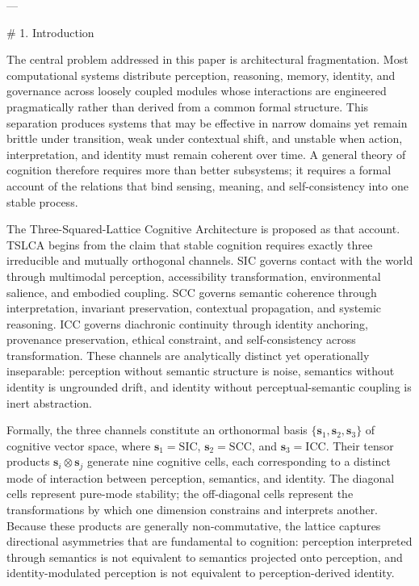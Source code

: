 ---

# 1. Introduction

The central problem addressed in this paper is architectural fragmentation. Most
computational systems distribute perception, reasoning, memory, identity, and
governance across loosely coupled modules whose interactions are engineered
pragmatically rather than derived from a common formal structure. This separation
produces systems that may be effective in narrow domains yet remain brittle under
transition, weak under contextual shift, and unstable when action, interpretation,
and identity must remain coherent over time. A general theory of cognition
therefore requires more than better subsystems; it requires a formal account of the
relations that bind sensing, meaning, and self-consistency into one stable process.

The Three-Squared-Lattice Cognitive Architecture is proposed as that account.
TSLCA begins from the claim that stable cognition requires exactly three irreducible
and mutually orthogonal channels. SIC governs contact with the world through
multimodal perception, accessibility transformation, environmental salience, and
embodied coupling. SCC governs semantic coherence through interpretation, invariant
preservation, contextual propagation, and systemic reasoning. ICC governs diachronic
continuity through identity anchoring, provenance preservation, ethical constraint,
and self-consistency across transformation. These channels are analytically distinct
yet operationally inseparable: perception without semantic structure is noise,
semantics without identity is ungrounded drift, and identity without
perceptual-semantic coupling is inert abstraction.

Formally, the three channels constitute an orthonormal basis
\(\{\mathbf{s}_1, \mathbf{s}_2, \mathbf{s}_3\}\) of cognitive vector space, where
\(\mathbf{s}_1 = \mathrm{SIC}\), \(\mathbf{s}_2 = \mathrm{SCC}\), and
\(\mathbf{s}_3 = \mathrm{ICC}\). Their tensor products \(\mathbf{s}_i \otimes
\mathbf{s}_j\) generate nine cognitive cells, each corresponding to a distinct mode
of interaction between perception, semantics, and identity. The diagonal cells
represent pure-mode stability; the off-diagonal cells represent the transformations
by which one dimension constrains and interprets another. Because these products are
generally non-commutative, the lattice captures directional asymmetries that are
fundamental to cognition: perception interpreted through semantics is not equivalent
to semantics projected onto perception, and identity-modulated perception is not
equivalent to perception-derived identity.


